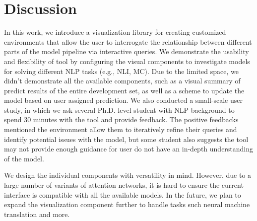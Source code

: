 \section{Discussion}
In this work, we introduce a visualization library for creating customized environments that allow the user to interrogate the relationship between different parts of the model pipeline via interactive queries.
%
We demonstrate the usability and flexibility of tool by configuring the visual components to investigate models for solving different NLP tasks (e.g., NLI, MC).
%
Due to the limited space, we didn't demonstrate all the available components, such as a visual summary of predict results of the entire development set, as well as a scheme to update the model based on user assigned prediction. 
%
We also conducted a small-scale user study, in which we ask several Ph.D. level student with NLP background to spend 30 minutes with the tool and provide feedback. The positive feedbacks mentioned the environment allow them to iteratively refine their queries and identify potential issues with the model, but some student also suggests the tool may not provide enough guidance for user do not have an in-depth understanding of the model.

We design the individual components with versatility in mind. However, due to a large number of variants of attention networks, it is hard to ensure the current interface is compatible with all the available models.
%
In the future, we plan to expand the visualization component further to handle tasks such neural machine translation and more. 
